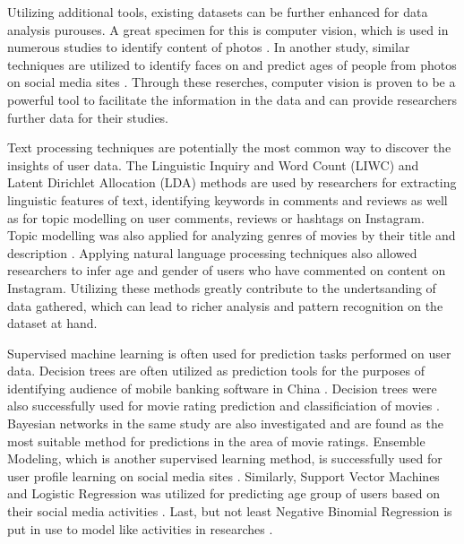 \documentclass[conference]{IEEEtran}
\begin{document}
  Utilizing additional tools, existing datasets can be further enhanced for data analysis purouses. A great specimen for this is computer vision, which is used in numerous studies to identify content of photos \cite{hu2014we, farseev2015harvestingmultiplesources}. In another study, similar techniques are utilized to identify faces on and predict ages of people from photos on social media sites \cite{han2016teensarefrommars, bakhshi2014faces}. Through these reserches, computer vision is proven to be a powerful tool to facilitate the information in the data and can provide researchers further data for their studies. 

  Text processing techniques are potentially the most common way to discover the insights of user data. The Linguistic Inquiry and Word Count (LIWC) and Latent Dirichlet Allocation (LDA) methods are used by researchers \cite{ottoni2013ladies, farseev2015harvestingmultiplesources, jang2016teensengagemorewithfewerphotos} for extracting linguistic features of text, identifying keywords in comments and reviews as well as for topic modelling on user comments, reviews or hashtags on Instagram. Topic modelling was also applied for analyzing genres of movies by their title and description \cite{kabinsingha2012movie}. Applying natural language processing techniques also allowed researchers to infer age and gender of users \cite{han2016teensarefrommars} who have commented on content on Instagram. Utilizing these methods greatly contribute to the undertsanding of data gathered, which can lead to richer analysis and pattern recognition on the dataset at hand. 

  Supervised machine learning is often used for prediction tasks performed on user data. Decision trees are often utilized as prediction tools for the purposes of identifying audience of mobile banking software in China \cite{chinesemobilebankingusers}. Decision trees were also successfully used for movie rating prediction \cite{saraee2004data} and classificiation of movies \cite{kabinsingha2012movie}. Bayesian networks in the same study \cite{kabinsingha2012movie} are also investigated and are found as the most suitable method for predictions in the area of movie ratings. Ensemble Modeling, which is another supervised learning method, is successfully used for user profile learning on social media sites \cite{farseev2015harvestingmultiplesources}. Similarly, Support Vector Machines and Logistic Regression was utilized for predicting age group of users based on their social media activities \cite{han2016teensarefrommars}. Last, but not least Negative Binomial Regression is put in use to model like activities in researches \cite{jang2015no, bakhshi2014faces}.
\end{document}
